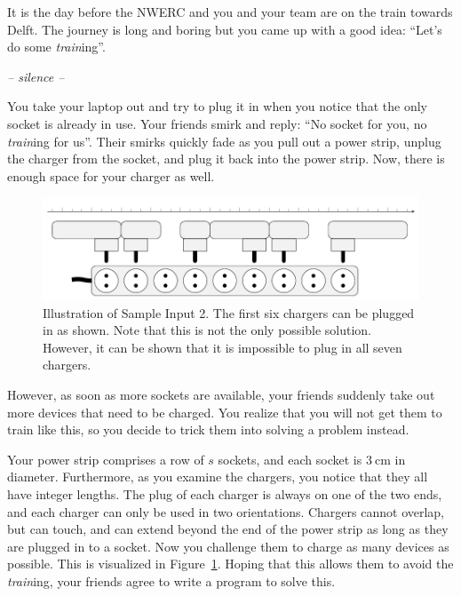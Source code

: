 It is the day before the NWERC and you and your team are on the train towards Delft.
The journey is long and boring but you came up with a good idea: ``Let's do some \emph{train}ing''.

\quad\emph{-- silence --}

You take your laptop out and try to plug it in when you notice that the only socket is already in use.
Your friends smirk and reply: ``No socket for you, no \emph{train}ing for us''.
Their smirks quickly fade as you pull out a power strip, unplug the charger from the socket, and plug it back into the power strip.
Now, there is enough space for your charger as well.


\begin{figure}[h]
    \centering
    \includegraphics{powerstrip.pdf}
    \caption{
        Illustration of Sample Input 2.
        The first six chargers can be plugged in as shown.
        Note that this is not the only possible solution.
        However, it can be shown that it is impossible to plug in all seven chargers.
    }
    \label{fig:powerstrip}
\end{figure}

However, as soon as more sockets are available, your friends suddenly take out more devices that need to be charged.
You realize that you will not get them to train like this, so you decide to trick them into solving a problem instead.

Your power strip comprises a row of $s$ sockets, and each socket is $\SI{3}{\cm}$ in diameter.
Furthermore, as you examine the chargers, you notice that they all have integer lengths.
The plug of each charger is always on one of the two ends, and each charger can
only be used in two orientations. Chargers cannot overlap, but can touch,
and can extend beyond the end of the power strip as long as they are plugged in
to a socket.
Now you challenge them to charge as many devices as possible.
This is visualized in Figure~\ref{fig:powerstrip}.
Hoping that this allows them to avoid the \emph{train}ing, your friends agree to write a program to solve this.

